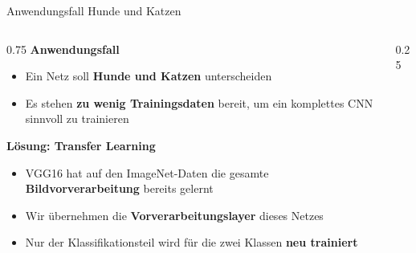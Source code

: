 \begin{frame}{  Anwendungsfall Hunde und Katzen}
\begin{columns}
\begin{column}{0.75\textwidth}
\textbf{Anwendungsfall}
\begin{itemize}
  \item Ein Netz soll \textbf{Hunde und Katzen} unterscheiden
  \item Es stehen \textbf{zu wenig Trainingsdaten} bereit, um ein komplettes CNN sinnvoll zu trainieren
\end{itemize}
\vfill
\textbf{Lösung: Transfer Learning}
\begin{itemize}
  \item VGG16 hat auf den ImageNet-Daten die gesamte \textbf{Bildvorverarbeitung} bereits gelernt
  \item Wir übernehmen die \textbf{Vorverarbeitungslayer} dieses Netzes
  \item Nur der Klassifikationsteil wird für die zwei Klassen \textbf{neu trainiert}
\end{itemize}
\end{column}
\begin{column}{0.25\textwidth}
\begin{center}
\\[1em]
\end{center}
\end{column}
\end{columns}
\end{frame}

